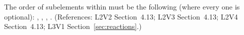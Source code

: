 The order of subelements within \Reaction must be the following
(where every one is optional): ,
, ,
.  (References: L2V2 Section~4.13; L2V3
Section~4.13; L2V4 Section~4.13; L3V1 Section~\ref{sec:reactions}.)
